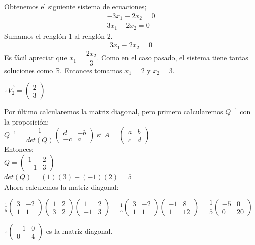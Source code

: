 \documentclass[letterpaper]{article}
\renewcommand{\*}{\cdot}
\theoremstyle{definition}
\begin{document}
	Obtenemos el siguiente sistema de ecuaciones;
	\begin{align*}
	-3x_{1}+2x_{2}= 0\\
	3x_{1}-2x_{2}=0
	\end{align*}
	Sumamos el renglón 1 al renglón 2.
	\begin{align*}
	3x_{1}-2x_{2}= 0
	\end{align*}
	Es fácil apreciar que $x_{1}= \dfrac{2x_{2}}{3}$. Como en el caso pasado, el sistema tiene tantas soluciones como $\mathbb{R}$. Entonces tomamos $x_{1}=2$ y $x_{2}=3$.
	\begin{center}
		$\therefore \vec{V_{2}} = \begin{pmatrix}	2 \\ 3	\end{pmatrix}$
	\end{center}
	Por último calcularemos la matriz diagonal, pero primero calcularemos $Q^{-1}$ con la proposición:\\
	$Q^{-1}=\dfrac{1}{det(Q)} \begin{pmatrix}	d & -b \\ -c & a \end{pmatrix}$     si  $A = \begin{pmatrix} 	a & b \\ c & d \end{pmatrix}$\\
	Entonces:\\
	
	$Q = \begin{pmatrix} 1 & 2 \\ -1 & 3 \end{pmatrix}$ \\        $det(Q) =(1)(3)-(-1)(2)= 5$\\
	Ahora calculemos la matriz diagonal:\\
	\begin{center}
	$\frac{1}{5}\begin{pmatrix}	3 & -2 \\ 1 & 1 \end{pmatrix} \begin{pmatrix}	1 & 2 \\ 3 & 2 \end{pmatrix} \begin{pmatrix} 	1 & 2 \\ -1 & 3	\end{pmatrix} = \frac{1}{5} \begin{pmatrix}
	3 & -2 \\ 1 & 1 \end{pmatrix} \begin{pmatrix}
	-1 & 8 \\ 1 & 12 \end{pmatrix}= \dfrac{1}{5}\begin{pmatrix} -5 & 0 \\ 0 & 20\end{pmatrix}$  
	\end{center}
	\begin{center}
	$\therefore \begin{pmatrix} -1 & 0 \\ 0 & 4 	\end{pmatrix}$ es la matriz diagonal.
	\end{center}
	
\end{document}
